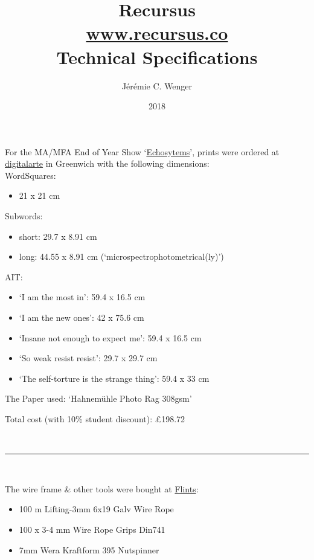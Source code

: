 \documentclass[9pt, twocolumn]{memoir}
\title{{\Huge Recursus}  \\ {\large \href{http://recursus.co/}{www.recursus.co}} \\ {\large Technical Specifications}}
\date{{\normalsize 2018}}
\author{Jérémie C. Wenger}
\providecommand{\tightlist}{%
  \setlength{\itemsep}{0pt}\setlength{\parskip}{0pt}}
\begin{document}
\maketitle
\thispagestyle{empty}

For the MA/MFA End of Year Show
`\href{http://echosystems.xyz/}{Echosytems}', prints were ordered at
\href{https://www.digitalarte.co.uk/}{digitalarte} in Greenwich with the
following dimensions: 
\\

WordSquares:

\begin{itemize}
\tightlist
\item
  21 x 21 cm
\end{itemize}

Subwords:

\begin{itemize}
\tightlist
\item
  short: 29.7 x 8.91 cm
\item
  long: 44.55 x 8.91 cm (`microspectrophotometrical(ly)')
\end{itemize}

AIT:

\begin{itemize}
\tightlist
\item
  `I am the most in': 59.4 x 16.5 cm
\item
  `I am the new ones': 42 x 75.6 cm
\item
  `Insane not enough to expect me': 59.4 x 16.5 cm
\item
  `So weak resist resist': 29.7 x 29.7 cm
\item
  `The self-torture is the strange thing': 59.4 x 33 cm
\end{itemize}


The Paper used: `Hahnemühle Photo Rag 308gsm'


Total cost (with 10\% student discount): £198.72

~

\fancybreak{§}

~

The wire frame \& other tools were bought at \href{http://www.flints.co.uk/content/}{Flints}:

\begin{itemize}
\tightlist
\item
  100 m Lifting-3mm 6x19 Galv Wire Rope
\item
  100 x 3-4 mm Wire Rope Grips Din741
\item
  7mm Wera Kraftform 395 Nutspinner 
\end{itemize}
\end{document}
